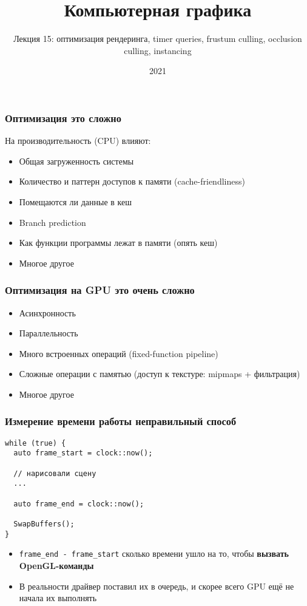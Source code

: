 \documentclass{beamer}
\title{Компьютерная графика}
\subtitle{Лекция 15: оптимизация рендеринга, timer queries, frustum culling, occlusion culling, instancing}
\date{2021}
\begin{document}
\frame{\titlepage}

\begin{frame}[fragile]
\frametitle{Оптимизация \textendash{} это сложно}
На производительность (CPU) влияют:
\pause
\begin{itemize}
\item Общая загруженность системы
\pause
\item Количество и паттерн доступов к памяти (cache-friendliness)
\pause
\item Помещаются ли данные в кеш
\pause
\item Branch prediction
\pause
\item Как функции программы лежат в памяти (опять кеш)
\pause
\item Многое другое
\end{itemize}
\end{frame}

\begin{frame}[fragile]
\frametitle{Оптимизация на GPU \textendash{} это очень сложно}
\begin{itemize}
\item Асинхронность
\pause
\item Параллельность
\pause
\item Много встроенных операций (fixed-function pipeline)
\pause
\item Сложные операции с памятью (доступ к текстуре: mipmaps + фильтрация)
\pause
\item Многое другое
\end{itemize}
\end{frame}

\begin{frame}[fragile]
\frametitle{Измерение времени работы \textendash{} неправильный способ}
\begin{verbatim}
while (true) {
  auto frame_start = clock::now();

  // нарисовали сцену
  ...

  auto frame_end = clock::now();

  SwapBuffers();
}
\end{verbatim}
\pause
\begin{itemize}
\item \verb|frame_end - frame_start| \textendash{} сколько времени ушло на то, чтобы \textbf{вызвать OpenGL-команды}
\pause
\item В реальности драйвер поставил их в очередь, и скорее всего GPU ещё не начала их выполнять
\end{itemize}
\end{frame}
\end{document}
